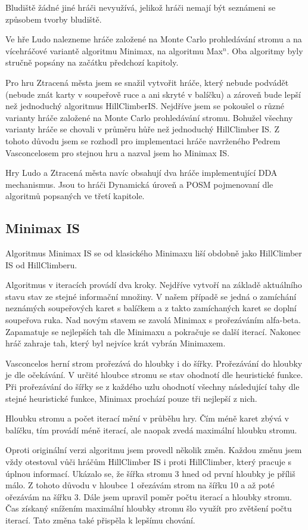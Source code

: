 Bludiště žádné jiné hráči nevyužívá, jelikož hráči nemají být seznámeni se způsobem tvorby bludiště.

Ve hře Ludo nalezneme hráče založené na Monte Carlo prohledávání stromu a na vícehráčové variantě algoritmu Minimax, na algoritmu Max$^n$. Oba algoritmy byly stručně popsány na začátku předchozí kapitoly.

Pro hru Ztracená města jsem se snažil vytvořit hráče, který nebude podvádět (nebude znát karty v soupeřově ruce a ani skryté v balíčku) a zároveň bude lepší než jednoduchý algoritmus HillClimberIS.
Nejdříve jsem se pokoušel o různé varianty hráče založené na Monte Carlo prohledávání stromu. Bohužel všechny varianty hráče se chovali v průměru hůře než jednoduchý HillClimber IS. Z tohoto důvodu jsem se rozhodl pro implementaci hráče navrženého Pedrem Vasconcelosem \cite{ch5LT} pro stejnou hru a nazval jsem ho Minimax IS.

Hry Ludo a Ztracená města navíc obsahují dva hráče implementující DDA mechanismus. Jsou to hráči Dynamická úroveň a POSM pojmenovaní dle algoritmů popsaných ve třetí kapitole.

\subsection{Minimax IS}

Algoritmus Minimax IS se od klasického Minimaxu liší obdobně jako HillClimber IS od HillClimberu. 

Algoritmus v iteracích provádí dva kroky. Nejdříve vytvoří na základě aktuálního stavu stav ze stejné informační množiny. V našem případě se jedná o zamíchání neznámých soupeřových karet s balíčkem a z takto zamíchaných karet se doplní soupeřova ruka. Nad novým stavem se zavolá Minimax s prořezáváním alfa-beta. Zapamatuje se nejlepších tah dle Minimaxu a pokračuje se další iterací. Nakonec hráč zahraje tah, který byl nejvíce krát vybrán Minimaxem.

Vasconcelos herní strom prořezává do hloubky i do šířky. Prořezávání do hloubky je dle očekávání. V určité hloubce stromu se stav ohodnotí dle heuristické funkce. Při prořezávání do šířky se z každého uzlu ohodnotí všechny následující tahy dle stejné heuristické funkce, Minimax prochází pouze tři nejlepší z nich.

Hloubku stromu a počet iterací mění v průběhu hry. Čím méně karet zbývá v balíčku, tím provádí méně iterací, ale naopak zvedá maximální hloubku stromu.

Oproti originální verzi algoritmu jsem provedl několik změn. Každou změnu jsem vždy otestoval vůči hráčům HillClimber IS i proti HillClimber, který pracuje s úplnou informací. Ukázalo se, že šířka stromu 3 hned od první hloubky je příliš málo. Z tohoto důvodu v hloubce 1 ořezávám strom na šířku 10 a až poté ořezávám na šířku 3. Dále jsem upravil poměr počtu iterací a hloubky stromu. Čas získaný snížením maximální hloubky stromu šlo využít pro zvětšení počtu iterací. Tato změna také přispěla k lepšímu chování. 

